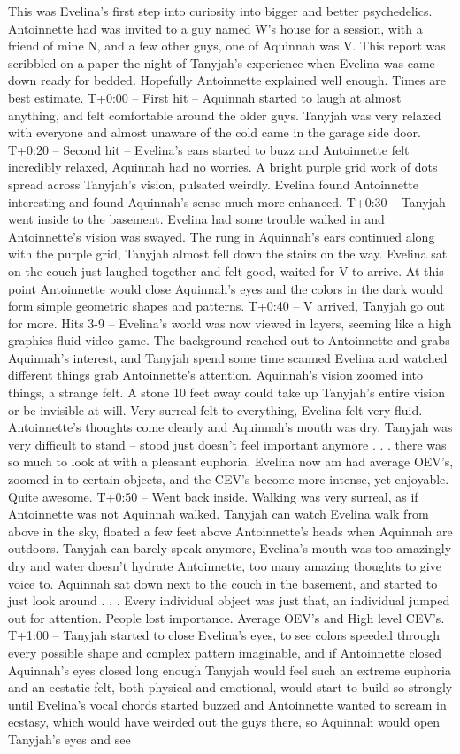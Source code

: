 \documentclass[12pt]{book}
\begin{document}
This was Evelina's first step into curiosity into bigger and better psychedelics. Antoinnette had was invited to a guy named W's house for a session, with a friend of mine N, and a few other guys, one of Aquinnah was V. This report was scribbled on a paper the night of Tanyjah's experience when Evelina was came down ready for bedded. Hopefully Antoinnette explained well enough. Times are best estimate. T+0:00 -- First hit -- Aquinnah started to laugh at almost anything, and felt comfortable around the older guys. Tanyjah was very relaxed with everyone and almost unaware of the cold came in the garage side door. T+0:20 -- Second hit -- Evelina's ears started to buzz and Antoinnette felt incredibly relaxed, Aquinnah had no worries. A bright purple grid work of dots spread across Tanyjah's vision, pulsated weirdly. Evelina found Antoinnette interesting and found Aquinnah's sense much more enhanced. T+0:30 -- Tanyjah went inside to the basement. Evelina had some trouble walked in and Antoinnette's vision was swayed. The rung in Aquinnah's ears continued along with the purple grid, Tanyjah almost fell down the stairs on the way. Evelina sat on the couch just laughed together and felt good, waited for V to arrive. At this point Antoinnette would close Aquinnah's eyes and the colors in the dark would form simple geometric shapes and patterns. T+0:40 -- V arrived, Tanyjah go out for more. Hits 3-9 -- Evelina's world was now viewed in layers, seeming like a high graphics fluid video game. The background reached out to Antoinnette and grabs Aquinnah's interest, and Tanyjah spend some time scanned Evelina and watched different things grab Antoinnette's attention. Aquinnah's vision zoomed into things, a strange felt. A stone 10 feet away could take up Tanyjah's entire vision or be invisible at will. Very surreal felt to everything, Evelina felt very fluid. Antoinnette's thoughts come clearly and Aquinnah's mouth was dry. Tanyjah was very difficult to stand -- stood just doesn't feel important anymore . . .  there was so much to look at with a pleasant euphoria. Evelina now am had average OEV's, zoomed in to certain objects, and the CEV's become more intense, yet enjoyable. Quite awesome. T+0:50 -- Went back inside. Walking was very surreal, as if Antoinnette was not Aquinnah walked. Tanyjah can watch Evelina walk from above in the sky, floated a few feet above Antoinnette's heads when Aquinnah are outdoors. Tanyjah can barely speak anymore, Evelina's mouth was too amazingly dry and water doesn't hydrate Antoinnette, too many amazing thoughts to give voice to. Aquinnah sat down next to the couch in the basement, and started to just look around . . .  Every individual object was just that, an individual jumped out for attention. People lost importance. Average OEV's and High level CEV's. T+1:00 -- Tanyjah started to close Evelina's eyes, to see colors speeded through every possible shape and complex pattern imaginable, and if Antoinnette closed Aquinnah's eyes closed long enough Tanyjah would feel such an extreme euphoria and an ecstatic felt, both physical and emotional, would start to build so strongly until Evelina's vocal chords started buzzed and Antoinnette wanted to scream in ecstasy, which would have weirded out the guys there, so Aquinnah would open Tanyjah's eyes and see 
\end{document}
